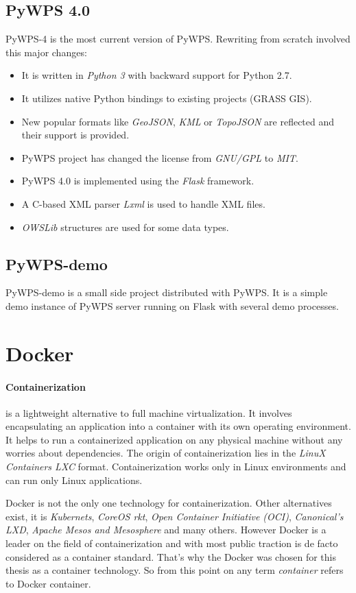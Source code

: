 \documentclass[12pt,a4paper]{article}
\begin{document}
\subsection{PyWPS 4.0}
PyWPS-4 is the most current version of PyWPS. Rewriting from scratch involved this major changes:
\begin{itemize}
\item It is written in \textit{Python 3} with backward support for Python 2.7.
\item It utilizes native Python bindings to existing projects (GRASS GIS).
\item New popular formats like \textit{GeoJSON}, \textit{KML} or \textit{TopoJSON} are reflected and their support is provided.
\item PyWPS project has changed the license from \textit{GNU/GPL} to \textit{MIT}.
\item PyWPS 4.0 is implemented using the \textit{Flask} framework.
\item A C-based XML parser \textit{Lxml} is used to handle XML files.
\item \textit{OWSLib} structures are used for some data types.
\end{itemize}

\subsection{PyWPS-demo}
PyWPS-demo is a small side project distributed with PyWPS. It is a simple demo instance of PyWPS server running on Flask with
several demo processes.

\newpage
\section{Docker}
\paragraph{Containerization} is a lightweight alternative to full machine virtualization. It involves encapsulating an application 
into a container with its own operating environment. It helps to run a containerized application on any physical machine without any
worries about dependencies. The origin of containerization lies in the \textit{LinuX Containers {LXC}} format. Containerization
works only in Linux environments and can run only Linux applications.

Docker is not the only one technology for containerization. Other alternatives exist, it is \textit{Kubernets}, \textit{CoreOS rkt}, 
\textit{Open Container Initiative (OCI)}, \textit{Canonical's LXD}, \textit{Apache Mesos and Mesosphere} and many others. 
However Docker is a leader on the field of containerization and with most public traction is de facto considered as a container standard.
That's why the Docker was chosen for this thesis as a container technology. So from this point on any term \textit{container} refers to
Docker container.
\end{document}
